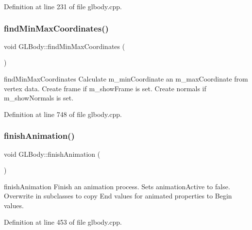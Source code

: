 Definition at line 231 of file glbody.\+cpp.

\mbox{\label{class_g_l_body_a780c5f3232c0c106dc81708ebe2c6228}} 
\subsubsection{\texorpdfstring{findMinMaxCoordinates()}{findMinMaxCoordinates()}}
{\footnotesize\ttfamily void G\+L\+Body\+::find\+Min\+Max\+Coordinates (\begin{DoxyParamCaption}{ }\end{DoxyParamCaption})\hspace{0.3cm}{\ttfamily [protected]}}



find\+Min\+Max\+Coordinates Calculate m\+\_\+min\+Coordinate an m\+\_\+max\+Coordinate from vertex data. Create frame if m\+\_\+show\+Frame is set. Create normals if m\+\_\+show\+Normals is set. 



Definition at line 748 of file glbody.\+cpp.

\mbox{\label{class_g_l_body_a1bcb3503a1758fef20d2bb1f9726b85a}} 
\subsubsection{\texorpdfstring{finishAnimation()}{finishAnimation()}}
{\footnotesize\ttfamily void G\+L\+Body\+::finish\+Animation (\begin{DoxyParamCaption}{ }\end{DoxyParamCaption})\hspace{0.3cm}{\ttfamily [virtual]}}



finish\+Animation Finish an animation process. Sets animation\+Active to false. Overwrite in subclasses to copy End values for animated properties to Begin values. 



Definition at line 453 of file glbody.\+cpp.

\mbox{\label{class_g_l_body_a80879471b9a5e1fd66dd7191c161d92c}} 
